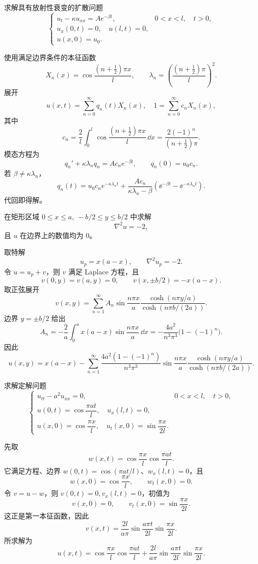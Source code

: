 \begin{question}
求解具有放射性衰变的扩散问题
\[
\begin{cases}
u_t-\kappa u_{xx}=Ae^{-\beta t},&0<x<l,
\quad t>0,\\
u_x(0,t)=0,
\quad u(l,t)=0,\\
u(x,0)=u_0.
\end{cases}
\]
\begin{solution}
使用满足边界条件的本征函数
\[
X_n(x)=\cos\frac{(n+\frac12)\pi x}{l},
\qquad
\lambda_n=\left(\frac{(n+\frac12)\pi}{l}\right)^2.
\]
展开
\[
u(x,t)=\sum_{n=0}^{\infty}q_n(t)X_n(x),
\quad
1=\sum_{n=0}^{\infty}c_nX_n(x),
\]
其中
\[
c_n=\frac2l\int_0^l\cos\frac{(n+\frac12)\pi x}{l}\,\dd{x}
=\frac{2(-1)^n}{(n+\frac12)\pi}.
\]
模态方程为
\[
q_n'+\kappa\lambda_nq_n=Ac_ne^{-\beta t},
\qquad q_n(0)=u_0c_n.
\]
若 \(\beta\ne\kappa\lambda_n\)，
\[
q_n(t)=u_0c_ne^{-\kappa\lambda_nt}
+\frac{Ac_n}{\kappa\lambda_n-\beta}
\left(\ee^{-\beta t}-\ee^{-\kappa\lambda_nt}\right).
\]
代回即得解。
\end{solution}
\end{question}

\begin{question}
在矩形区域 \(0\le x\le a,\ -b/2\le y\le b/2\) 中求解
\[
\nabla^2u=-2,
\]
且 \(u\) 在边界上的数值均为 \(0\)。
\begin{solution}
取特解
\[
u_p=x(a-x),
\qquad \nabla^2u_p=-2.
\]
令 \(u=u_p+v\)，则 \(v\) 满足 Laplace 方程，且
\[
v(0,y)=v(a,y)=0,
\qquad
v(x,\pm b/2)=-x(a-x).
\]
取正弦展开
\[
v(x,y)=\sum_{n=1}^{\infty}A_n
\sin\frac{n\pi x}{a}
\frac{\cosh(n\pi y/a)}{\cosh(n\pi b/(2a))}.
\]
边界 \(y=\pm b/2\) 给出
\[
A_n=-\frac2a\int_0^a x(a-x)\sin\frac{n\pi x}{a}\,\dd{x}
=-\frac{4a^2}{n^3\pi^3}\bigl(1-(-1)^n\bigr).
\]
因此
\[
u(x,y)=x(a-x)-\sum_{n=1}^{\infty}
\frac{4a^2(1-(-1)^n)}{n^3\pi^3}
\sin\frac{n\pi x}{a}
\frac{\cosh(n\pi y/a)}{\cosh(n\pi b/(2a))}.
\]
\end{solution}
\end{question}

\begin{question}
求解定解问题
\[
\begin{cases}
u_{tt}-a^2u_{xx}=0,&0<x<l,
\quad t>0,\\
u(0,t)=\cos\dfrac{\pi at}{l},
\quad u_x(l,t)=0,\\
u(x,0)=\cos\dfrac{\pi x}{l},
\quad u_t(x,0)=\sin\dfrac{\pi x}{2l}.
\end{cases}
\]
\begin{solution}
先取
\[
w(x,t)=\cos\frac{\pi x}{l}\cos\frac{\pi at}{l}.
\]
它满足方程、边界 \(w(0,t)=\cos(\pi at/l)\)、\(w_x(l,t)=0\)，且
\[
w(x,0)=\cos\frac{\pi x}{l},\qquad w_t(x,0)=0.
\]
令 \(v=u-w\)，则 \(v(0,t)=0,
 v_x(l,t)=0\)，初值为
\[
v(x,0)=0,
\qquad v_t(x,0)=\sin\frac{\pi x}{2l}.
\]
这正是第一本征函数，因此
\[
v(x,t)=\frac{2l}{a\pi}
\sin\frac{a\pi t}{2l}
\sin\frac{\pi x}{2l}.
\]
所求解为
\[
u(x,t)=\cos\frac{\pi x}{l}\cos\frac{\pi at}{l}
+\frac{2l}{a\pi}\sin\frac{a\pi t}{2l}\sin\frac{\pi x}{2l}.
\]
\end{solution}
\end{question}

